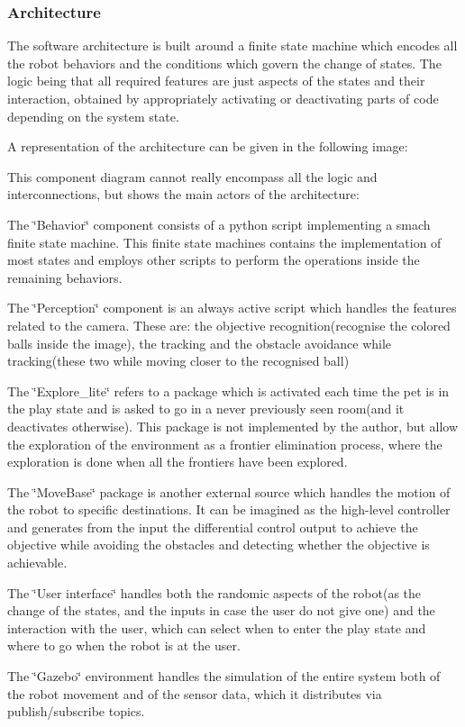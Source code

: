 \subsubsection*{Architecture}

The software architecture is built around a finite state machine which encodes all the robot behaviors and the conditions which govern the change of states. The logic being that all required features are just aspects of the states and their interaction, obtained by appropriately activating or deactivating parts of code depending on the system state.

A representation of the architecture can be given in the following image\+: 

This component diagram cannot really encompass all the logic and interconnections, but shows the main actors of the architecture\+:
\begin{DoxyItemize}
\item The \char`\"{}\+Behavior\char`\"{} component consists of a python script implementing a smach finite state machine. This finite state machines contains the implementation of most states and employs other scripts to perform the operations inside the remaining behaviors.
\item The \char`\"{}\+Perception\char`\"{} component is an always active script which handles the features related to the camera. These are\+: the objective recognition(recognise the colored balls inside the image), the tracking and the obstacle avoidance while tracking(these two while moving closer to the recognised ball)
\item The \char`\"{}\+Explore\+\_\+lite\char`\"{} refers to a package which is activated each time the pet is in the play state and is asked to go in a never previously seen room(and it deactivates otherwise). This package is not implemented by the author, but allow the exploration of the environment as a frontier elimination process, where the exploration is done when all the frontiers have been explored.
\item The \char`\"{}\+Move\+Base\char`\"{} package is another external source which handles the motion of the robot to specific destinations. It can be imagined as the high-\/level controller and generates from the input the differential control output to achieve the objective while avoiding the obstacles and detecting whether the objective is achievable.
\item The \char`\"{}\+User interface\char`\"{} handles both the randomic aspects of the robot(as the change of the states, and the inputs in case the user do not give one) and the interaction with the user, which can select when to enter the play state and where to go when the robot is at the user.
\item The \char`\"{}\+Gazebo\char`\"{} environment handles the simulation of the entire system both of the robot movement and of the sensor data, which it distributes via publish/subscribe topics.
\end{DoxyItemize}

